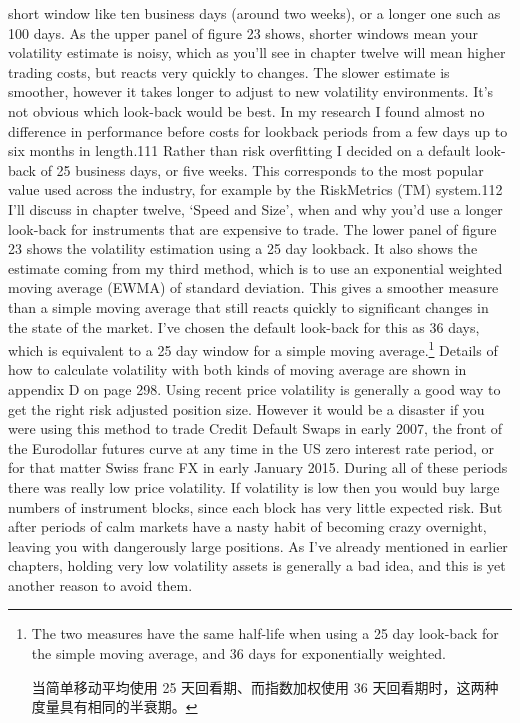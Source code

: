 \begin{englishblock} short window like ten business days (around two weeks), or a longer one such as 100 days. As the upper panel of figure 23 shows, shorter windows mean your volatility estimate is noisy, which as you'll see in chapter twelve will mean higher trading costs, but reacts very quickly to changes. The slower estimate is smoother, however it takes longer to adjust to new volatility environments. It's not obvious which look-back would be best. In my research I found almost no difference in performance before costs for lookback periods from a few days up to six months in length.111 Rather than risk overfitting I decided on a default look-back of 25 business days, or five weeks. This corresponds to the most popular value used across the industry, for example by the RiskMetrics (TM) system.112 I'll discuss in chapter twelve, ‘Speed and Size', when and why you'd use a longer look-back for instruments that are expensive to trade. The lower panel of figure 23 shows the volatility estimation using a 25 day lookback. It also shows the estimate coming from my third method, which is to use an exponential weighted moving average (EWMA) of standard deviation. This gives a smoother measure than a simple moving average that still reacts quickly to significant changes in the state of the market. I've chosen the default look-back for this as 36 days, which is equivalent to a 25 day window for a simple moving average.\footnote{The two measures have the same half-life when using a 25 day look-back for the simple moving average, and 36 days for exponentially weighted. \par 当简单移动平均使用 25 天回看期、而指数加权使用 36 天回看期时，这两种度量具有相同的半衰期。} Details of how to calculate volatility with both kinds of moving average are shown in appendix D on page 298. Using recent price volatility is generally a good way to get the right risk adjusted position size. However it would be a disaster if you were using this method to trade Credit Default Swaps in early 2007, the front of the Eurodollar futures curve at any time in the US zero interest rate period, or for that matter Swiss franc FX in early January 2015. During all of these periods there was really low price volatility. If volatility is low then you would buy large numbers of instrument blocks, since each block has very little expected risk. But after periods of calm markets have a nasty habit of becoming crazy overnight, leaving you with dangerously large positions. As I've already mentioned in earlier chapters, holding very low volatility assets is generally a bad idea, and this is yet another reason to avoid them. \end{englishblock}

